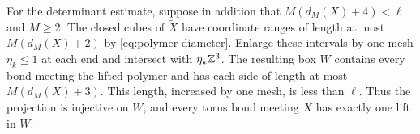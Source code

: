 For the determinant estimate, suppose in addition that
$M(d_M(X)+4)<\ell$ and $M\ge2$. The closed cubes of $\widetilde X$
have coordinate ranges of length at most $M(d_M(X)+2)$ by
\eqref{eq:polymer-diameter}. Enlarge these intervals by one mesh
$\eta_k\le1$ at each end and intersect with $\eta_k\mathbb Z^3$. The
resulting box $W$ contains every bond meeting the lifted polymer and
has each side of length at most $M(d_M(X)+3)$. This length, increased
by one mesh, is less than $\ell$. Thus the projection is injective
on $W$, and every torus bond meeting $X$ has exactly one lift in $W$.

